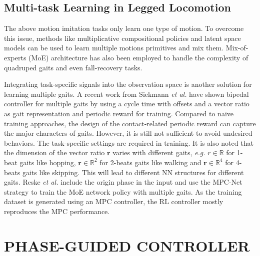 \documentclass[letterpaper, 10 pt, journal, twoside]{IEEEtran} %
\begin{document}
\subsection{Multi-task Learning in Legged Locomotion}
The above motion imitation tasks only learn one type of motion. To overcome this issue, methods like multiplicative compositional policies\cite{MCPPeng19} and latent space models\cite{CARL2020} can be used to learn multiple motions primitives and mix them. Mix-of-experts (MoE) architecture has also been employed to handle the complexity of quadruped gaits and even fall-recovery tasks\cite{Yangeabb2174}.

Integrating task-specific signals into the observation space is another solution for learning multiple gaits. A recent work from Siekmann \textit{et al.}\cite{siekmann2021simtoreal} have shown bipedal controller for multiple gaits by using a cycle time with offsets and a vector ratio as gait representation and periodic reward for training. Compared to naive training approaches, the design of the contact-related periodic reward can capture the major characters of gaits. However, it is still not sufficient to avoid undesired behaviors. The task-specific settings are required in training. It is also noted that the dimension of the vector ratio $\boldsymbol{r}$ varies with different gaits, \textit{e.g.} $r\in\mathbb{R}$ for 1-beat gaits like hopping, $\boldsymbol{r}\in\mathbb{R}^{2}$ for 2-beats gaits like walking and $\boldsymbol{r}\in\mathbb{R}^{4}$ for 4-beats gaits like skipping. This will lead to different NN structures for different gaits. Reske \textit{et al.}\cite{reske2021imitation} include the origin phase in the input and use the MPC-Net\cite{Carius_2020} strategy to train the MoE network policy with multiple gaits. As the training dataset is generated using an MPC controller, the RL controller mostly reproduces the MPC performance.

\section{PHASE-GUIDED CONTROLLER}
\end{document}
